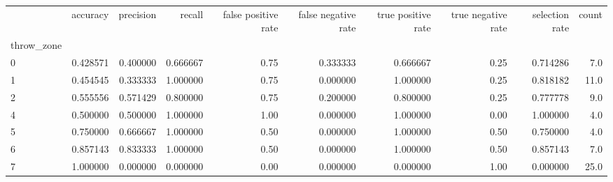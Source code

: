 \begin{tabular}{lrrrrrrrrr}
\toprule
{} &  accuracy &  precision &    recall &  false positive rate &  false negative rate &  true positive rate &  true negative rate &  selection rate &  count \\
throw\_zone &           &            &           &                      &                      &                     &                     &                 &        \\
\midrule
0          &  0.428571 &   0.400000 &  0.666667 &                 0.75 &             0.333333 &            0.666667 &                0.25 &        0.714286 &    7.0 \\
1          &  0.454545 &   0.333333 &  1.000000 &                 0.75 &             0.000000 &            1.000000 &                0.25 &        0.818182 &   11.0 \\
2          &  0.555556 &   0.571429 &  0.800000 &                 0.75 &             0.200000 &            0.800000 &                0.25 &        0.777778 &    9.0 \\
4          &  0.500000 &   0.500000 &  1.000000 &                 1.00 &             0.000000 &            1.000000 &                0.00 &        1.000000 &    4.0 \\
5          &  0.750000 &   0.666667 &  1.000000 &                 0.50 &             0.000000 &            1.000000 &                0.50 &        0.750000 &    4.0 \\
6          &  0.857143 &   0.833333 &  1.000000 &                 0.50 &             0.000000 &            1.000000 &                0.50 &        0.857143 &    7.0 \\
7          &  1.000000 &   0.000000 &  0.000000 &                 0.00 &             0.000000 &            0.000000 &                1.00 &        0.000000 &   25.0 \\
\bottomrule
\end{tabular}
